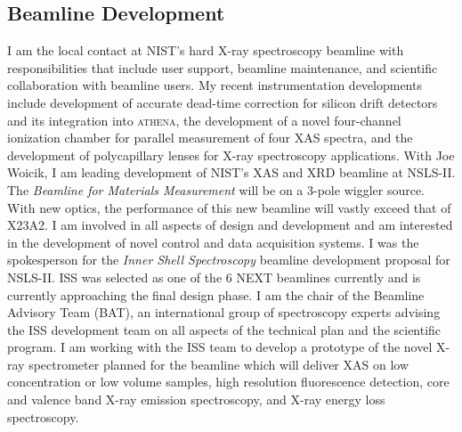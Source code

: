 \documentclass[11pt]{moderncv}
\begin{document}
\subsection{Beamline Development}
%
{I am the local contact at NIST's hard X-ray spectroscopy beamline
  with responsibilities that include user support, beamline
  maintenance, and scientific collaboration with beamline users.  My
  recent instrumentation developments include development of
  accurate dead-time correction for silicon drift detectors and its
  integration into \textsc{athena}, the development of a novel
  four-channel ionization chamber for parallel measurement of four XAS
  spectra, and the development of polycapillary lenses for X-ray
  spectroscopy applications.}
%
%
{With Joe Woicik, I am leading development of NIST's XAS and XRD
  beamline at NSLS-II.  The \textit{Beamline for Materials
    Measurement} will be on a 3-pole wiggler source.  With new optics,
  the performance of this new beamline will vastly exceed that of
  X23A2.  I am involved in all aspects of design and development and
  am interested in the development of novel control and data
  acquisition systems.}
%
%
{I was the spokesperson for the \textit{Inner Shell Spectroscopy}
  beamline development proposal for NSLS-II.  ISS was selected as one
  of the 6 NEXT beamlines currently and is currently approaching the
  final design phase.  I am the chair of the Beamline Advisory Team
  (BAT), an international group of spectroscopy experts advising the
  ISS development team on all aspects of the technical plan and the
  scientific program.  I am working with the ISS team to develop a
  prototype of the novel X-ray spectrometer planned for the beamline
  which will deliver XAS on low concentration or low volume samples,
  high resolution fluorescence detection, core and valence band X-ray
  emission spectroscopy, and X-ray energy loss spectroscopy.}


\end{document}
